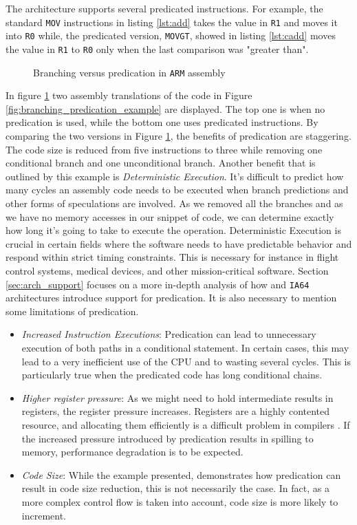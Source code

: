The \armvs architecture supports several predicated instructions. For example, the standard \texttt{MOV} instructions in listing \ref{lst:add} takes the value in \texttt{R1} and moves it into \texttt{R0} while, the predicated version, \texttt{MOVGT}, showed in listing \ref{lst:cadd} moves the value in \texttt{R1} to \texttt{R0} only when the last comparison was "greater than". \\

\begin{figure}[h!]
\centering

\caption{Branching versus predication in \texttt{ARM} assembly}
\label{fig:branching_predication_ARM}
\end{figure}

In figure \ref{fig:branching_predication_ARM} two assembly translations of the code in Figure \ref{fig:branching_predication_example} are displayed. The top one is when no predication is used, while the bottom one uses predicated instructions.
By comparing the two versions in Figure \ref{fig:branching_predication_ARM}, the benefits of predication are staggering. The code size is reduced from five instructions to three while removing one conditional branch and one unconditional branch. Another benefit that is outlined by this example is \textit{Deterministic Execution}. It's difficult to predict how many cycles an assembly code needs to be executed when branch predictions and other forms of speculations are involved. As we removed all the branches and as we have no memory accesses in our snippet of code, we can determine exactly how long it's going to take to execute the operation. Deterministic Execution is crucial in certain fields where the software needs to have predictable behavior and respond within strict timing constraints. This is necessary for instance in flight control systems, medical devices, and other mission-critical software.
Section \ref{sec:arch_support} focuses on a more in-depth analysis of how \armvs and \texttt{IA64} architectures introduce support for predication. It is also necessary to mention some limitations of predication.
\begin{itemize}
    \item \textit{Increased Instruction Executions}: Predication can lead to unnecessary execution of both paths in a conditional statement. In certain cases, this may lead to a very inefficient use of the CPU and to wasting several cycles. This is particularly true when the predicated code has long conditional chains.
    \item \textit{Higher register pressure}: As we might need to hold intermediate results in registers, the register pressure increases. Registers are a highly contented resource, and allocating them efficiently is a difficult problem in compilers \cite{chaitin1981register}. If the increased pressure introduced by predication results in spilling to memory, performance degradation is to be expected.
    \item \textit{Code Size}: While the example presented,  demonstrates how predication can result in code size reduction, this is not necessarily the case. In fact, as a more complex control flow is taken into account, code size is more likely to increment.
\end{itemize}

